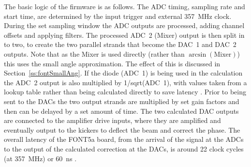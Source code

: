 The basic logic of the firmware is as follows. The ADC timing, sampling rate and start time, are determined by the input trigger and external 357~MHz clock. During the set sampling window the ADC outputs are processed, adding channel offsets and applying filters. The processed ADC~2 (Mixer) output is then split in to two, to create the two parallel strands that become the DAC~1 and DAC~2 outputs. Note that as the Mixer is used directly (rather than \(\arcsin(\mathrm{Mixer})\)) this uses the small angle approximation. The effect of this is discussed in Section~\ref{ss:fontSmallAng}. If the diode (ADC~1) is being used in the calculation the ADC~2 output is also multiplied by 1/sqrt(ADC~1), with values taken from a lookup table rather than being calculated directly to save latency \cite{glennCLIC13}. Prior to being sent to the DACs the two output strands are multiplied by set gain factors and then can be delayed by a set amount of time. The two calculated DAC outputs are connected to the amplifier drive inputs, where they are amplified and eventually output to the kickers to deflect the beam and correct the phase. 
The overall latency of the FONT5a board, from the arrival of the signal at the ADCs to the output of the calculated correction at the DACs, is around 22 clock cycles (at 357~MHz) or 60~ns \cite{glennCLIC14}.


